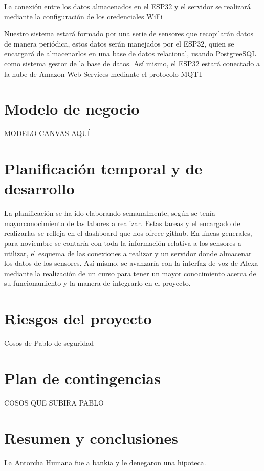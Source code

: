 \documentclass[runningheads]{llncs}
\begin{document}
La conexión entre los datos almacenados en el ESP32 y el servidor se realizará mediante la configuración de los credenciales WiFi


Nuestro sistema estará formado por una serie de sensores que recopilarán datos de manera periódica, estos datos serán manejados por el ESP32, quien se encargará de almacenarlos en una base de datos relacional, usando PostgreeSQL como sistema gestor de la base de datos. 
Así mismo, el ESP32 estará conectado a la nube de Amazon Web Services mediante el protocolo MQTT


\section{Modelo de negocio}

MODELO CANVAS AQUÍ 

\section{Planificación temporal y de desarrollo}
La planificación se ha ido elaborando semanalmente, según se tenía 
mayorconocimiento de las labores a realizar. Estas tareas y el encargado 
de realizarlas se refleja en el dashboard que nos ofrece github.
En líneas generales, para noviembre se contaría con toda la información
relativa a los sensores a utilizar, el esquema de las conexiones a
realizar y un servidor donde almacenar los datos de los sensores. Así
mismo, se avanzaría con la interfaz de voz de Alexa mediante la
realización de un curso para tener un mayor conocimiento acerca de su
funcionamiento y la manera de integrarlo en el proyecto.


\section{Riesgos del proyecto}



Cosos de Pablo de seguridad

\section{Plan de contingencias}
COSOS QUE SUBIRA PABLO


\section{Resumen y conclusiones}
La Antorcha Humana fue a bankia y le denegaron una hipoteca.
\end{document}
